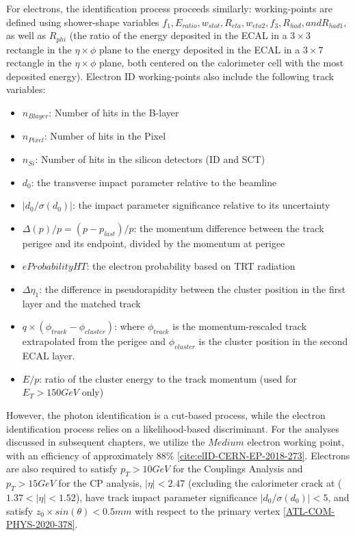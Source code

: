 For electrons, the identification process proceeds similarly: working-points are defined using shower-shape variables $f_{1}, E_{ratio}, w_{s tot}, R_{eta}, w_{eta2}, f_{3}, R_{had}, and R_{had1},$ as well as $R_{phi}$ (the ratio of the energy deposited in the ECAL in a $3 \times 3$ rectangle in the $\eta \times \phi$ plane to the energy deposited in the ECAL in a $3 \times 7$ rectangle in the $\eta \times \phi$ plane, both centered on the calorimeter cell with the most deposited energy). Electron ID working-points also include the following track variables:
\begin{itemize}
\item $n_{Blayer}$: Number of hits in the B-layer
\item $n_{Pixel}$: Number of hits in the Pixel
\item $n_{Si}$: Number of hits in the silicon detectors (ID and SCT)
\item $d_{0}$: the transverse impact parameter relative to the beamline
\item $|d_{0} / \sigma(d_{0})|$: the impact parameter significance relative to its uncertainty
\item $\Delta(p)/p = (p-p_{last})/p$: the momentum difference between the track perigee and its endpoint, divided by the momentum at perigee
\item $eProbabilityHT$: the electron probability based on TRT radiation
\item $\Delta \eta_{1}$: the difference in pseudorapidity between the cluster position in the first layer and the matched track
\item $q \times (\phi_{track}-\phi_{cluster})$: where $\phi_{track}$ is the momentum-rescaled track extrapolated from the perigee and $\phi_{cluster}$ is the cluster position in the second ECAL layer.
\item $E/p$: ratio of the cluster energy to the track momentum (used for $E_{T} > 150 GeV$ only) 
\end{itemize}

However, the photon identification is a cut-based process, while the electron identification process relies on a likelihood-based discriminant. For the analyses discussed in subsequent chapters, we utilize the $Medium$ electron working point, with an efficiency of approximately 88$\%$ \ref{cite:elID-CERN-EP-2018-273}. Electrons are also required to satisfy $p_{T} > 10 GeV$ for the Couplings Analysis and$p_{T} > 15 GeV$ for the CP analysis, $|\eta| < 2.47$ (excluding the calorimeter crack at ($1.37<|\eta|<1.52$), have track impact parameter significance $|d_{0} / \sigma(d_{0})| < 5$, and satisfy $z_{0} \times sin(\theta) < 0.5 mm$ with respect to the primary vertex \ref{ATL-COM-PHYS-2020-378}.

